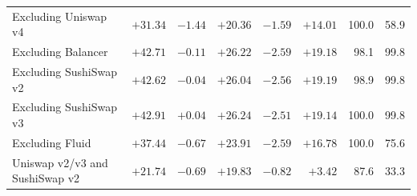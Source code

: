 \begin{tabularx}{\linewidth}{@{}>{\raggedright\arraybackslash}Xrrrrrrr@{}}
Excluding Uniswap v4 & $+31.34$ & $-1.44$ & $+20.36$ & $-1.59$ & $+14.01$ & 100.0 & 58.9 \\
Excluding Balancer & $+42.71$ & $-0.11$ & $+26.22$ & $-2.59$ & $+19.18$ & 98.1 & 99.8 \\
Excluding SushiSwap v2 & $+42.62$ & $-0.04$ & $+26.04$ & $-2.56$ & $+19.19$ & 98.9 & 99.8 \\
Excluding SushiSwap v3 & $+42.91$ & $+0.04$ & $+26.24$ & $-2.51$ & $+19.14$ & 100.0 & 99.8 \\
Excluding Fluid & $+37.44$ & $-0.67$ & $+23.91$ & $-2.59$ & $+16.78$ & 100.0 & 75.6 \\
Uniswap v2/v3 and SushiSwap v2 & $+21.74$ & $-0.69$ & $+19.83$ & $-0.82$ & $+3.42$ & 87.6 & 33.3 \\
\bottomrule
\end{tabularx}
